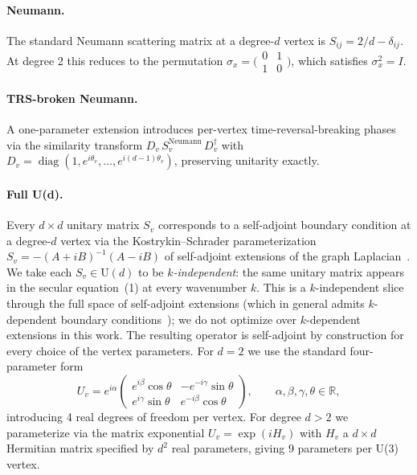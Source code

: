 \documentclass[cntp]{ipart}
\theoremstyle{plain}
\theoremstyle{remark}
\begin{document}
\paragraph{Neumann.} The standard Neumann scattering matrix at a degree-$d$ vertex is $S_{ij} = 2/d - \delta_{ij}$. At degree 2 this reduces to the permutation $\sigma_x = \bigl(\begin{smallmatrix} 0 & 1 \\ 1 & 0 \end{smallmatrix}\bigr)$, which satisfies $\sigma_x^2 = I$.

\paragraph{TRS-broken Neumann.} A one-parameter extension introduces per-vertex time-reversal-breaking phases via the similarity transform $D_v\,S_v^{\mathrm{Neumann}}\,D_v^\dagger$ with $D_v = \operatorname{diag}(1, e^{i\theta_v}, \ldots, e^{i(d-1)\theta_v})$, preserving unitarity exactly.

\paragraph{Full U(d).} Every $d \times d$ unitary matrix $S_v$ corresponds to a self-adjoint boundary condition at a degree-$d$ vertex via the Kostrykin--Schrader parameterization $S_v = -(A + iB)^{-1}(A - iB)$ of self-adjoint extensions of the graph Laplacian~\cite{r3,r10}. We take each $S_v \in \mathrm{U}(d)$ to be \emph{$k$-independent}: the same unitary matrix appears in the secular equation~(1) at every wavenumber $k$. This is a $k$-independent slice through the full space of self-adjoint extensions (which in general admits $k$-dependent boundary conditions~\cite{r3}); we do not optimize over $k$-dependent extensions in this work. The resulting operator is self-adjoint by construction for every choice of the vertex parameters. For $d = 2$ we use the standard four-parameter form
\begin{equation}
    U_v = e^{i\alpha} \begin{pmatrix} e^{i\beta}\cos\theta & -e^{-i\gamma}\sin\theta \\ e^{i\gamma}\sin\theta & e^{-i\beta}\cos\theta \end{pmatrix}, \qquad \alpha, \beta, \gamma, \theta \in \mathbb{R},
\end{equation}
introducing 4 real degrees of freedom per vertex. For degree $d > 2$ we parameterize via the matrix exponential $U_v = \exp(iH_v)$ with $H_v$ a $d \times d$ Hermitian matrix specified by $d^2$ real parameters, giving 9 parameters per U(3) vertex.
\end{document}
